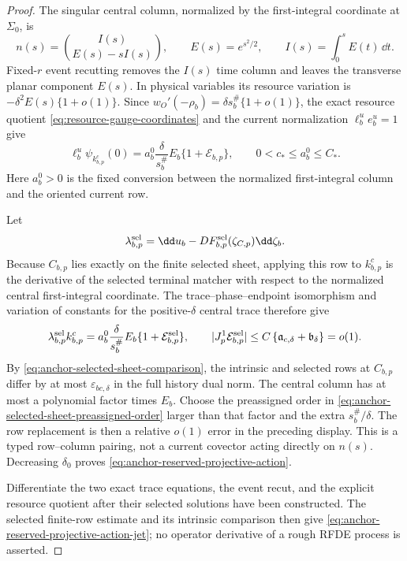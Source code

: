 \begin{proof}
The singular central column, normalized by the first-integral coordinate at
\(\Sigma_0\), is
\begin{equation}
 n(s)=\binom{I(s)}{E(s)-sI(s)},\qquad
 E(s)=e^{s^2/2},\qquad
 I(s)=\int_0^sE(t)\,\dd t.                           \label{eq:anchor-reserved-singular-column}
\end{equation}
Fixed-\(r\) event recutting removes the \(I(s)\) time column and leaves the
transverse planar component \(E(s)\).  In physical variables its resource
variation is \(-\delta^2E(s)\{1+o(1)\}\).  Since
\(w_O'(-\rho_b)=\delta s_b^\#\{1+o(1)\}\), the exact resource quotient
\cref{eq:resource-gauge-coordinates} and the current normalization
\(\ell_b^ue_b^u=1\) give
\begin{equation}
 \ell_b^u\psi_{k^c_{b,p}}(0)
 =a_b^0\frac{\delta}{s_b^\#}E_b
   \{1+\mathcal E_{b,p}\},\qquad
 0<c_*\le a_b^0\le C_* .                             \label{eq:anchor-reserved-typed-singular-pairing}
\end{equation}
Here \(a_b^0>0\) is the fixed conversion between the normalized
first-integral column and the oriented current row.

Let
\[
 \lambda_{b,p}^{\rm sel}
 =\dd u_b-D F_{b,p}^{\rm sel}(\zeta_{C,p})\dd\zeta_b.
\]
Because \(C_{b,p}\) lies exactly on the finite selected sheet, applying
this row to \(k_{b,p}^c\) is the derivative of the selected terminal
matcher with respect to the normalized central first-integral coordinate.
The trace--phase--endpoint isomorphism and variation of constants for the
positive-\(\delta\) central trace therefore give
\begin{equation}
 \lambda_{b,p}^{\rm sel}k_{b,p}^c
 =a_b^0\frac{\delta}{s_b^\#}E_b
       \{1+\mathcal E_{b,p}^{\rm sel}\},
 \qquad
 |J_p^1\mathcal E_{b,p}^{\rm sel}|
 \le C\left\{\mathfrak a_{c,\delta}
       +\mathfrak b_\delta\right\}=o(1).             \label{eq:anchor-reserved-projective-error}
\end{equation}
By \cref{eq:anchor-selected-sheet-comparison}, the intrinsic and selected
rows at \(C_{b,p}\) differ by at most \(\varepsilon_{bc,\delta}\) in the
full history dual norm.  The central column has at most a polynomial factor
times \(E_b\).  Choose the preassigned order in
\cref{eq:anchor-selected-sheet-preassigned-order} larger than that factor
and the extra \(s_b^\#/\delta\).  The row replacement is then a relative
\(o(1)\) error in the preceding display.  This is a typed row--column
pairing, not a current covector acting directly on \(n(s)\).  Decreasing
\(\delta_0\) proves
\cref{eq:anchor-reserved-projective-action}.

Differentiate the two exact trace equations, the event recut, and the
explicit resource quotient after their selected solutions have been
constructed.  The selected finite-row estimate and its intrinsic
comparison then give
\cref{eq:anchor-reserved-projective-action-jet}; no operator derivative of
a rough RFDE process is asserted.
\end{proof}

